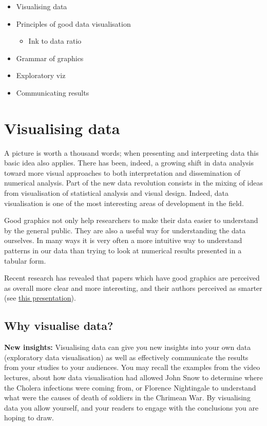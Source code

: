 \documentclass[
]{book}
\providecommand{\tightlist}{%
  \setlength{\itemsep}{0pt}\setlength{\parskip}{0pt}}
\begin{document}
\begin{itemize}
\tightlist
\item
  Visualising data
\item
  Principles of good data visualisation

  \begin{itemize}
  \tightlist
  \item
    Ink to data ratio
  \end{itemize}
\item
  Grammar of graphics
\item
  Exploratory viz
\item
  Communicating results
\end{itemize}

\hypertarget{visualising-data}{%
\section{Visualising data}\label{visualising-data}}

A picture is worth a thousand words; when presenting and interpreting data this basic idea also applies. There has been, indeed, a growing shift in data analysis toward more visual approaches to both interpretation and dissemination of numerical analysis. Part of the new data revolution consists in the mixing of ideas from visualisation of statistical analysis and visual design. Indeed, data visualisation is one of the most interesting areas of development in the field.

Good graphics not only help researchers to make their data easier to understand by the general public. They are also a useful way for understanding the data ourselves. In many ways it is very often a more intuitive way to understand patterns in our data than trying to look at numerical results presented in a tabular form.

Recent research has revealed that papers which have good graphics are perceived as overall more clear and more interesting, and their authors perceived as smarter (see \href{https://vimeo.com/181771433}{this presentation}).

\hypertarget{why-visualise-data}{%
\subsection{Why visualise data?}\label{why-visualise-data}}

\textbf{New insights:} Visualising data can give you new insights into your own data (exploratory data visualisation) as well as effectively communicate the results from your studies to your audiences. You may recall the examples from the video lectures, about how data visualisation had allowed John Snow to determine where the Cholera infections were coming from, or Florence Nightingale to understand what were the causes of death of soldiers in the Chrimean War. By visualising data you allow yourself, and your readers to engage with the conclusions you are hoping to draw.
\end{document}
